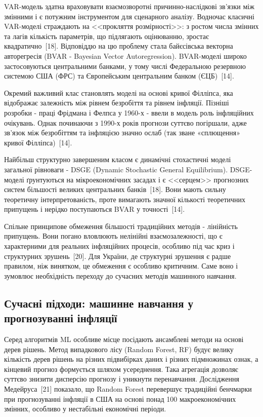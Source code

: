 \documentclass[a4paper,ukrainian,oneside]{extreport}
\begin{document}
VAR-модель здатна враховувати взаємозворотні причинно-наслідкові зв'язки між змінними і є потужним інструментом для сценарного аналізу. Водночас класичні VAR-моделі страждають на <<прокляття розмірності>>: з ростом числа змінних та лагів кількість параметрів, що підлягають оцінюванню, зростає квадратично~[18]. Відповіддю на цю проблему стала байєсівська векторна авторегресія (BVAR - Bayesian Vector Autoregression). BVAR-моделі широко застосовуються центральними банками, у тому числі Федеральною резервною системою США (ФРС) та Європейським центральним банком (ЄЦБ)~[14].

Окремий важливий клас становлять моделі на основі кривої Філліпса, яка відображає залежність між рівнем безробіття та рівнем інфляції. Пізніші розробки - праці Фрідмана і Фелпса у 1960-х - ввели в модель роль інфляційних очікувань. Однак починаючи з 1990-х років прогнози суттєво погіршали, адже зв'язок між безробіттям та інфляцією значно ослаб (так зване «сплющення» кривої Філліпса)~[14].

Найбільш структурно завершеним класом є динамічні стохастичні моделі загальної рівноваги - DSGE (Dynamic Stochastic General Equilibrium). DSGE-моделі ґрунтуються на мікроекономічних засадах і є <<серцем>> прогнозних систем більшості великих центральних банків~[18]. Вони мають сильну теоретичну інтерпретованість, проте вимагають значної кількості теоретичних припущень і нерідко поступаються BVAR у точності~[14].

Спільне принципове обмеження більшості традиційних методів - лінійність припущень. Вони погано вловлюють нелінійні взаємозалежності, що є характерними для реальних інфляційних процесів, особливо під час криз і структурних зрушень~[20]. Для України, де структурні зрушення є радше правилом, ніж винятком, це обмеження є особливо критичним. Саме воно і зумовлює необхідність переходу до сучасних методів машинного навчання.

\subsection{Сучасні підходи: машинне навчання у прогнозуванні інфляції}

Серед алгоритмів ML особливе місце посідають ансамблеві методи на основі дерев рішень. Метод випадкового лісу (Random Forest, RF) будує велику кількість дерев рішень на різних підвибірках даних і різних підмножинах ознак, а кінцевий прогноз формується шляхом усереднення. Така агрегація дозволяє суттєво знизити дисперсію прогнозу і уникнути перенавчання. Дослідження Медейруса~[21] показало, що Random Forest перевершує традиційні бенчмарки при прогнозуванні інфляції в США на основі понад 100 макроекономічних змінних, особливо у нестабільні економічні періоди.
\end{document}
